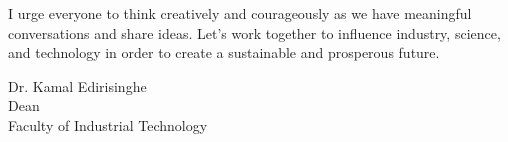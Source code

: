I urge everyone to think creatively and courageously as we have meaningful conversations and share ideas. Let's work together to influence industry, science, and technology in order to create a sustainable and prosperous future.

	
	\vspace{1cm}
	Dr. Kamal Edirisinghe\\
Dean\\
Faculty of Industrial Technology